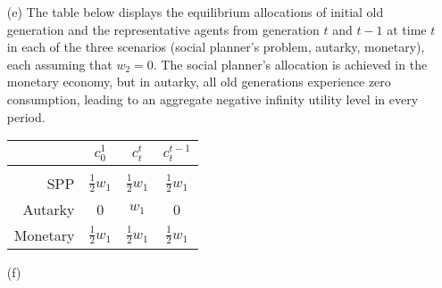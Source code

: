 \documentclass{article}
\begin{document}
\begin{itemize}
	\item[(e)] The table below displays the equilibrium allocations of initial old generation and the representative agents from generation $t$ and $t-1$ at time $t$ in each of the three scenarios (social planner's problem, autarky, monetary), each assuming that $w_2 = 0$. The social planner's allocation is achieved in the monetary economy, but in autarky, all old generations experience zero consumption, leading to an aggregate negative infinity utility level in every period.
		\begin{center}
			\begin{tabular}{r|c c c}
							& $c_0^1$			& $c_t^t$ 			& $c_t^{t-1}$			\\
				\hline		&					&					&						\\
				SPP			& $\frac{1}{2}w_1$	& $\frac{1}{2}w_1$	& $\frac{1}{2}w_1$		\\
				Autarky 	& 0					& $w_1$				& 0						\\
				Monetary	& $\frac{1}{2}w_1$	& $\frac{1}{2}w_1$	& $\frac{1}{2}w_1$
			\end{tabular}
		\end{center}
		
	\item[(f)] 
		
\end{itemize}




\end{document}
